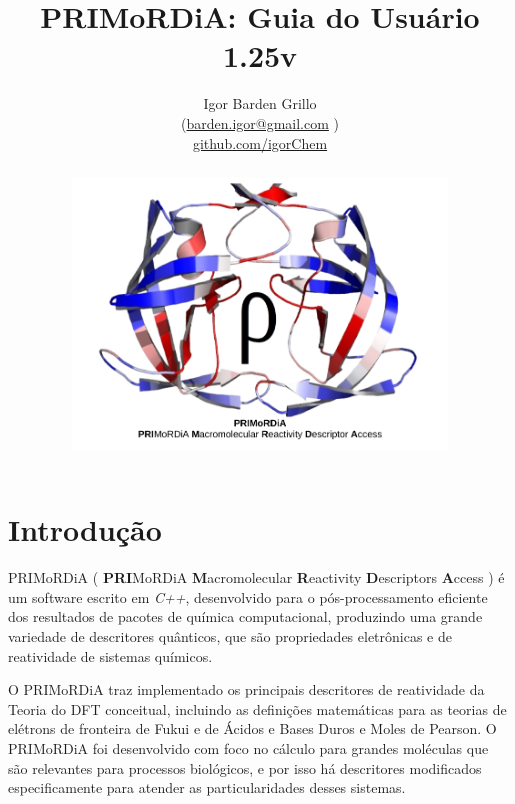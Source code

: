 \documentclass[a4paper,11pt]{refart}
\title{PRIMoRDiA: Guia do Usuário 1.25v  }
\author{Igor Barden Grillo \\(\url{barden.igor@gmail.com} )\\\url{github.com/igorChem}}
\begin{document}
\maketitle

\begin{abstract}
\hspace*{-1.4\leftmarginwidth}
\begin{minipage}{\fullwidth}
\begin{figure}[H]
	\begin{center}
		\includegraphics[width=7in]{logo_primordia}
	\end{center}
\end{figure}

\end{minipage}

\end{abstract}
\newpage
\tableofcontents
\newpage

\section{Introdução}

PRIMoRDiA ( \textbf{PRI}MoRDiA \textbf{M}acromolecular \textbf{R}eactivity \textbf{D}escriptors \textbf{A}ccess ) é um software escrito em \emph{C++}, desenvolvido para o pós-processamento eficiente dos resultados de pacotes de química computacional, produzindo uma grande variedade de descritores quânticos, que são propriedades eletrônicas e de reatividade de sistemas químicos. 

O PRIMoRDiA traz implementado os principais descritores de reatividade da Teoria do DFT conceitual, incluindo as definições matemáticas para as teorias de elétrons de fronteira de Fukui e de Ácidos e Bases Duros e Moles de Pearson. O PRIMoRDiA foi desenvolvido com foco no cálculo para grandes moléculas que são relevantes para processos biológicos, e por isso há descritores modificados especificamente para atender as particularidades desses sistemas. 
\end{document}
